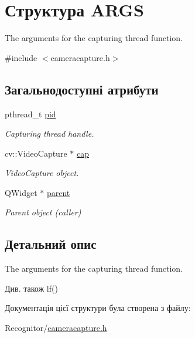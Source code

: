 \hypertarget{structARGS}{\section{Структура A\-R\-G\-S}
\label{structARGS}
}


The arguments for the capturing thread function.  




{\ttfamily \#include $<$cameracapture.\-h$>$}

\subsection*{Загальнодоступні атрибути}
\begin{DoxyCompactItemize}
\item 
\hypertarget{structARGS_af74ee694152c4be9de805a3fe7b709dc}{pthread\-\_\-t \hyperlink{structARGS_af74ee694152c4be9de805a3fe7b709dc}{pid}}\label{structARGS_af74ee694152c4be9de805a3fe7b709dc}

\begin{DoxyCompactList}\small\item\em Capturing thread handle. \end{DoxyCompactList}\item 
\hypertarget{structARGS_a6b299867eec1febb4d3ed313ac73f0d7}{cv\-::\-Video\-Capture $\ast$ \hyperlink{structARGS_a6b299867eec1febb4d3ed313ac73f0d7}{cap}}\label{structARGS_a6b299867eec1febb4d3ed313ac73f0d7}

\begin{DoxyCompactList}\small\item\em Video\-Capture object. \end{DoxyCompactList}\item 
\hypertarget{structARGS_a761da80183bdbfbf9a293c9ba1130d2c}{Q\-Widget $\ast$ \hyperlink{structARGS_a761da80183bdbfbf9a293c9ba1130d2c}{parent}}\label{structARGS_a761da80183bdbfbf9a293c9ba1130d2c}

\begin{DoxyCompactList}\small\item\em Parent object (caller) \end{DoxyCompactList}\end{DoxyCompactItemize}


\subsection{Детальний опис}
The arguments for the capturing thread function. 

\begin{DoxySeeAlso}{Див. також}
lf() 
\end{DoxySeeAlso}


Документація цієї структури була створена з файлу\-:\begin{DoxyCompactItemize}
\item 
Recognitor/\hyperlink{cameracapture_8h}{cameracapture.\-h}\end{DoxyCompactItemize}
